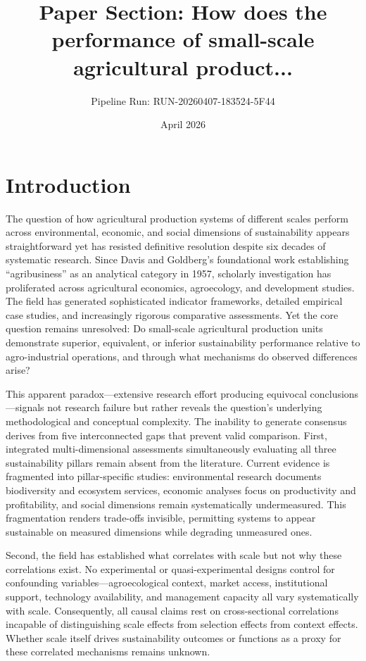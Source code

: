 \documentclass[12pt, a4paper]{article}
\title{Paper Section: How does the performance of small-scale agricultural product...}
\author{Pipeline Run: RUN-20260407-183524-5F44}
\date{April 2026}
\begin{document}
\maketitle

\section{Introduction}

The question of how agricultural production systems of different scales perform across environmental, economic, and social dimensions of sustainability appears straightforward yet has resisted definitive resolution despite six decades of systematic research. Since Davis and Goldberg's foundational work establishing ``agribusiness'' as an analytical category in 1957, scholarly investigation has proliferated across agricultural economics, agroecology, and development studies. The field has generated sophisticated indicator frameworks, detailed empirical case studies, and increasingly rigorous comparative assessments. Yet the core question remains unresolved: Do small-scale agricultural production units demonstrate superior, equivalent, or inferior sustainability performance relative to agro-industrial operations, and through what mechanisms do observed differences arise?

This apparent paradox---extensive research effort producing equivocal conclusions---signals not research failure but rather reveals the question's underlying methodological and conceptual complexity. The inability to generate consensus derives from five interconnected gaps that prevent valid comparison. First, integrated multi-dimensional assessments simultaneously evaluating all three sustainability pillars remain absent from the literature. Current evidence is fragmented into pillar-specific studies: environmental research documents biodiversity and ecosystem services, economic analyses focus on productivity and profitability, and social dimensions remain systematically undermeasured. This fragmentation renders trade-offs invisible, permitting systems to appear sustainable on measured dimensions while degrading unmeasured ones.

Second, the field has established what correlates with scale but not why these correlations exist. No experimental or quasi-experimental designs control for confounding variables---agroecological context, market access, institutional support, technology availability, and management capacity all vary systematically with scale. Consequently, all causal claims rest on cross-sectional correlations incapable of distinguishing scale effects from selection effects from context effects. Whether scale itself drives sustainability outcomes or functions as a proxy for these correlated mechanisms remains unknown.
\end{document}
